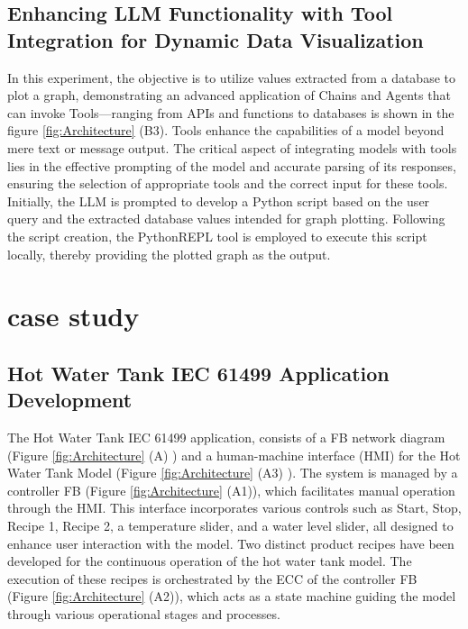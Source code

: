 \documentclass[conference]{IEEEtran}
\begin{document}
\subsection{Enhancing LLM Functionality with Tool Integration for Dynamic Data Visualization}

In this experiment, the objective is to utilize values extracted from a database to plot a graph, demonstrating an advanced application of Chains and Agents that can invoke Tools—ranging from APIs and functions to databases is shown in the figure \ref{fig:Architecture} (B3). Tools enhance the capabilities of a model beyond mere text or message output. The critical aspect of integrating models with tools lies in the effective prompting of the model and accurate parsing of its responses, ensuring the selection of appropriate tools and the correct input for these tools. Initially, the LLM is prompted to develop a Python script based on the user query and the extracted database values intended for graph plotting. Following the script creation, the PythonREPL tool is employed to execute this script locally, thereby providing the plotted graph as the output. 


\section{case study}
\label{sec:casestudy}


\subsection{Hot Water Tank IEC 61499 Application Development}

The Hot Water Tank IEC 61499 application, consists of a FB network diagram (Figure  \ref{fig:Architecture} (A) ) and a human-machine interface (HMI) for the Hot Water Tank Model (Figure \ref{fig:Architecture} (A3) ). The system is managed by a controller FB (Figure \ref{fig:Architecture} (A1)), which facilitates manual operation through the HMI. This interface incorporates various controls such as Start, Stop, Recipe 1, Recipe 2, a temperature slider, and a water level slider, all designed to enhance user interaction with the model. Two distinct product recipes have been developed for the continuous operation of the hot water tank model. The execution of these recipes is orchestrated by the ECC of the controller FB (Figure \ref{fig:Architecture} (A2)), which acts as a state machine guiding the model through various operational stages and processes.
\end{document}
